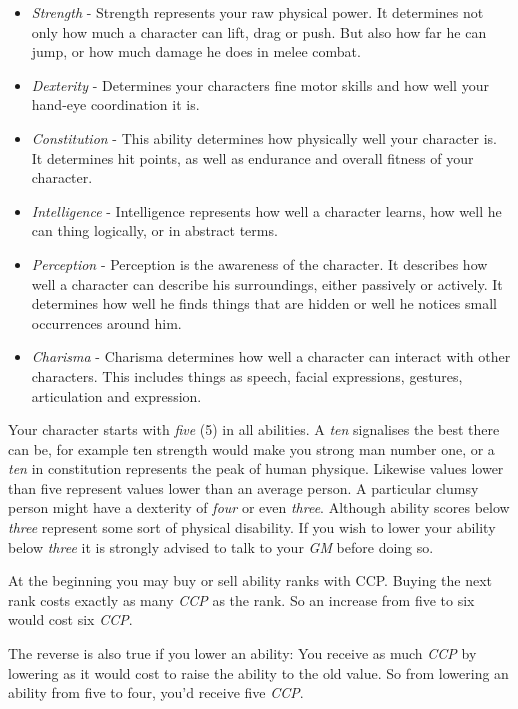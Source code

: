 \begin{itemize}
\item \emph{Strength} - Strength represents your raw physical power. It
  determines not only how much a character can lift, drag or push. But also how
  far he can jump, or how much damage he does in melee combat.
\item \emph{Dexterity} - Determines your characters fine motor skills and how
  well your hand-eye coordination it is.
\item \emph{Constitution} - This ability determines how physically well your
  character is. It determines hit points, as well as endurance and overall
  fitness of your character.
\item \emph{Intelligence} - Intelligence represents how well a character learns,
  how well he can thing logically, or in abstract terms.
\item \emph{Perception} - Perception is the awareness of the character. It
  describes how well a character can describe his surroundings, either passively
  or actively. It determines how well he finds things that are hidden or
  well he notices small occurrences around him.
\item \emph{Charisma} - Charisma determines how well a character can interact
  with other characters. This includes things as speech, facial expressions,
  gestures, articulation and expression.
\end{itemize}

Your character starts with \emph{five} (5) in all abilities. A \emph{ten}
signalises the best there can be, for example ten strength would make you
strong man number one, or a \emph{ten} in constitution represents the peak of
human physique. Likewise values lower than five represent values lower than an
average person. A particular clumsy person might have a dexterity of
\emph{four} or even \emph{three}. Although ability scores below \emph{three}
represent some sort of physical disability. If you wish to lower your ability
below \emph{three} it is strongly advised to talk to your \emph{GM} before
doing so.

At the beginning you may buy or sell ability ranks with CCP. Buying the next
rank costs exactly as many \emph{CCP} as the rank. So an increase from five to
six would cost six \emph{CCP}.

The reverse is also true if you lower an ability: You receive as much \emph{CCP}
by lowering as it would cost to raise the ability to the old value. So from
lowering an ability from five to four, you'd receive five \emph{CCP}.


